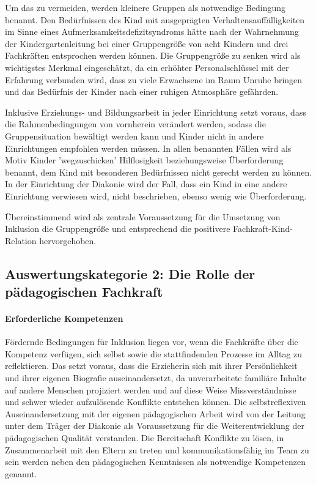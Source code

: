 Um das zu vermeiden, werden kleinere Gruppen als notwendige Bedingung benannt. Den Bedürfnissen des Kind mit ausgeprägten Verhaltensauffälligkeiten im Sinne eines Aufmerksamkeitsdefizitsyndroms hätte nach der Wahrnehmung der Kindergartenleitung bei einer Gruppengröße von acht Kindern und drei Fachkräften entsprochen werden können. 
Die Gruppengröße zu senken wird als wichtigstes Merkmal eingeschätzt, da ein erhöhter Personalschlüssel mit der Erfahrung verbunden wird, dass zu viele Erwachsene im Raum Unruhe bringen und das Bedürfnis der Kinder nach einer ruhigen Atmosphäre gefährden.

Inklusive Erziehungs- und Bildungsarbeit in jeder Einrichtung setzt voraus, dass die Rahmenbedingungen von vornherein verändert werden, sodass die Gruppensituation bewältigt werden kann und Kinder nicht in andere Einrichtungen empfohlen werden müssen. In allen benannten Fällen wird als Motiv Kinder 'wegzuschicken' Hilflosigkeit beziehungsweise Überforderung benannt, dem Kind mit besonderen Bedürfnissen nicht gerecht werden zu können. In der Einrichtung der Diakonie wird der Fall, dass ein Kind in eine andere Einrichtung verwiesen wird, nicht beschrieben, ebenso wenig wie Überforderung. 

Übereinstimmend wird als zentrale Voraussetzung für die Umsetzung von Inklusion die Gruppengröße und entsprechend die positivere Fachkraft-Kind-Relation hervorgehoben. 

\subsection{Auswertungskategorie 2: Die Rolle der pädagogischen Fachkraft}

\paragraph{Erforderliche Kompetenzen}
Fördernde Bedingungen für Inklusion liegen vor, wenn die Fachkräfte über die Kompetenz verfügen, sich selbst sowie die stattfindenden Prozesse im Alltag zu reflektieren. Das setzt voraus, dass die Erzieherin sich mit ihrer Persönlichkeit und ihrer eigenen Biografie auseinandersetzt, da unverarbeitete familiäre Inhalte auf andere Menschen projiziert werden und auf diese Weise Missverständnisse und schwer wieder aufzulösende Konflikte entstehen können. Die selbstreflexiven Auseinandersetzung mit der eigenen pädagogischen Arbeit wird von der Leitung unter dem Träger der Diakonie als Voraussetzung für die Weiterentwicklung der pädagogischen Qualität verstanden. 
Die Bereitschaft Konflikte zu lösen, in Zusammenarbeit mit den Eltern zu treten und kommunikationsfähig im Team zu sein werden neben den pädagogischen Kenntnissen als notwendige Kompetenzen genannt.

